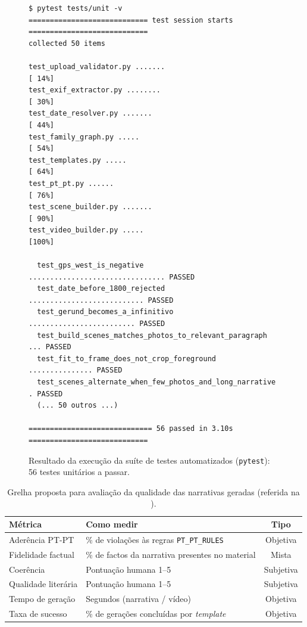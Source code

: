 \begin{figure}[H]
\centering
\begin{lstlisting}[numbers=none,frame=single,basicstyle=\ttfamily\scriptsize,
                   xleftmargin=4pt,framexleftmargin=2pt]
$ pytest tests/unit -v
============================ test session starts ============================
collected 50 items

test_upload_validator.py .......                                    [ 14%]
test_exif_extractor.py ........                                      [ 30%]
test_date_resolver.py .......                                       [ 44%]
test_family_graph.py .....                                          [ 54%]
test_templates.py .....                                             [ 64%]
test_pt_pt.py ......                                                 [ 76%]
test_scene_builder.py .......                                       [ 90%]
test_video_builder.py .....                                         [100%]

  test_gps_west_is_negative ................................ PASSED
  test_date_before_1800_rejected ........................... PASSED
  test_gerund_becomes_a_infinitivo ......................... PASSED
  test_build_scenes_matches_photos_to_relevant_paragraph ... PASSED
  test_fit_to_frame_does_not_crop_foreground ............... PASSED
  test_scenes_alternate_when_few_photos_and_long_narrative . PASSED
  (... 50 outros ...)

============================= 56 passed in 3.10s ============================
\end{lstlisting}
\caption{Resultado da execução da suíte de testes automatizados
(\texttt{pytest}): 56 testes unitários a passar.}
\label{fig:pytest}
\end{figure}

\begin{table}[H]
\centering
\caption{Grelha proposta para avaliação da qualidade das narrativas
geradas (referida na ).}
\label{tab:metricas}
\small
\begin{tabularx}{\linewidth}{@{}p{3.6cm}Yc@{}}
\toprule
\textbf{Métrica} & \textbf{Como medir} & \textbf{Tipo} \\
\midrule
Aderência PT-PT       & \% de violações às regras \texttt{PT\_PT\_RULES} & Objetiva \\
Fidelidade factual    & \% de factos da narrativa presentes no material   & Mista \\
Coerência             & Pontuação humana 1--5                              & Subjetiva \\
Qualidade literária   & Pontuação humana 1--5                              & Subjetiva \\
Tempo de geração      & Segundos (narrativa / vídeo)                       & Objetiva \\
Taxa de sucesso       & \% de gerações concluídas por \emph{template}      & Objetiva \\
\bottomrule
\end{tabularx}
\end{table}
